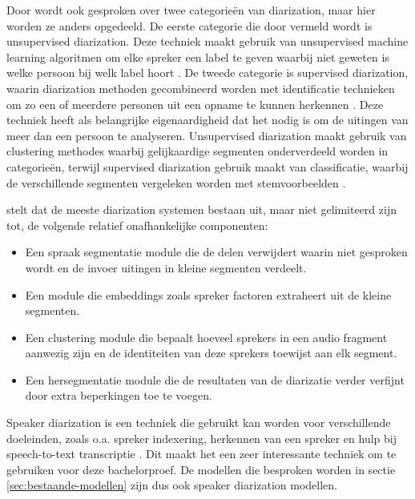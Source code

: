 Door \textcite{Khoma2023} wordt ook gesproken over twee categorieën van diarization, maar hier worden ze anders opgedeeld. De eerste categorie die door \textcite{Khoma2023} vermeld wordt is unsupervised diarization. Deze techniek maakt gebruik van unsupervised machine learning algoritmen om elke spreker een label te geven waarbij niet geweten is welke persoon bij welk label hoort \autocite{Khoma2023}. De tweede categorie is supervised diarization, waarin diarization methoden gecombineerd worden met identificatie technieken om zo een of meerdere personen uit een opname te kunnen herkennen \autocite{Khoma2023}. Deze techniek heeft als belangrijke eigenaardigheid dat het nodig is om de uitingen van meer dan een persoon te analyseren\autocite{Khoma2023}. Unsupervised diarization maakt gebruik van clustering methodes waarbij gelijkaardige segmenten onderverdeeld worden in categorieën, terwijl supervised diarization gebruik maakt van classificatie, waarbij de verschillende segmenten vergeleken worden met stemvoorbeelden \autocite{Khoma2023}.

\textcite{Zhang2018} stelt dat de meeste diarization systemen bestaan uit, maar niet gelimiteerd zijn tot, de volgende relatief onafhankelijke componenten:
\begin{itemize}
	\item Een spraak segmentatie module die de delen verwijdert waarin niet gesproken wordt en de invoer uitingen in kleine segmenten verdeelt.
	\item Een module die embeddings zoals spreker factoren extraheert uit de kleine segmenten.
	\item Een clustering module die bepaalt hoeveel sprekers in een audio fragment aanwezig zijn en de identiteiten van deze sprekers toewijst aan elk segment.
	\item Een hersegmentatie module die de resultaten van de diarizatie verder verfijnt door extra beperkingen toe te voegen.
\end{itemize}

Speaker diarization is een techniek die gebruikt kan worden voor verschillende doeleinden, zoals o.a. spreker indexering, herkennen van een spreker en hulp bij speech-to-text transcriptie \autocite{AngueraMiro2012}. Dit maakt het een zeer interessante techniek om te gebruiken voor deze bachelorproef. De modellen die besproken worden in sectie \ref{sec:bestaande-modellen} zijn dus ook speaker diarization modellen.

